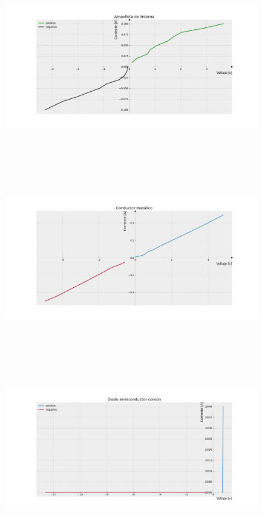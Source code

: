\documentclass[]{article}
\begin{document}
\begin{figure}
  \centering
  \includegraphics[width=12cm, height=8cm]{img/Figure_1.png}
\end{figure}

\begin{figure}
  \centering
  \includegraphics[width=12cm, height=8cm]{img/Figure_2.png}
\end{figure}

\begin{figure}
  \centering
  \includegraphics[width=12cm, height=8cm]{img/Figure_3.png}
\end{figure}
\end{document}
